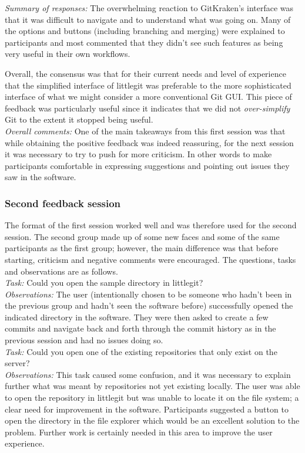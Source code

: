 \noindent \emph{Summary of responses: } The overwhelming reaction to GitKraken's interface was that it was difficult to navigate and to understand what was going on. Many of the options and buttons (including branching and merging) were explained to participants and most commented that they didn't see such features as being very useful in their own workflows. 

Overall, the consensus was that for their current needs and level of experience that the simplified interface of littlegit was preferable to the more sophisticated interface of what we might consider a more conventional Git GUI. This piece of feedback was particularly useful since it indicates that we did not \emph{over-simplify} Git to the extent it stopped being useful. \\

\noindent \emph{Overall comments: } One of the main takeaways from this first session was that while obtaining the positive feedback was indeed reassuring, for the next session it was necessary to try to push for more criticism. In other words to make participants comfortable in expressing suggestions and pointing out issues they saw in the software.

\subsubsection{Second feedback session}

The format of the first session worked well and was therefore used for the second session. The second group made up of some new faces and some of the same participants as the first group; however, the main difference was that before starting, criticism and negative comments were encouraged. The questions, tasks and observations are as follows.\\

\noindent \emph{Task: } Could you open the sample directory in littlegit?\\
\noindent \emph{Observations: } The user (intentionally chosen to be someone who hadn't been in the previous group and hadn't seen the software before) successfully opened the indicated directory in the software. They were then asked to create a few commits and navigate back and forth through the commit history as in the previous session and had no issues doing so.\\

\noindent \emph{Task: } Could you open one of the existing repositories that only exist on the server?\\
\noindent \emph{Observations: } This task caused some confusion, and it was necessary to explain further what was meant by repositories not yet existing locally. The user was able to open the repository in littlegit but was unable to locate it on the file system; a clear need for improvement in the software. Participants suggested a button to open the directory in the file explorer which would be an excellent solution to the problem. Further work is certainly needed in this area to improve the user experience. \\

